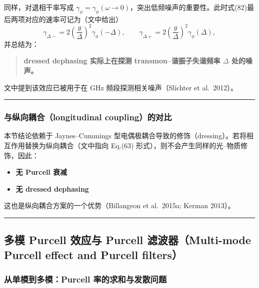 \documentclass[12pt,a4paper,oneside]{ctexbook}
\begin{document}
同样，对退相干率写成 $\gamma_\phi=\gamma_\phi(\omega\to 0)$，突出低频噪声的重要性。此时式(82)最后两项对应的速率可记为（文中给出）
\begin{equation}
\gamma_{\Delta-}=2\left(\frac{g}{\Delta}\right)^2\gamma_\phi(-\Delta),\qquad
\gamma_{\Delta+}=2\left(\frac{g}{\Delta}\right)^2\gamma_\phi(\Delta),
\end{equation}
并总结为：

\begin{quote}
\textbf{dressed dephasing 实际上在探测 transmon--谐振子失谐频率 $\Delta$ 处的噪声。}
\end{quote}

文中提到该效应已被用于在 GHz 频段探测相关噪声（Slichter et al.\ 2012）。

\bigskip\hrule\bigskip

\subsubsection{与纵向耦合（longitudinal coupling）的对比}

本节结论依赖于 Jaynes--Cummings 型电偶极耦合导致的修饰（dressing）。若将相互作用替换为纵向耦合（文中指向 Eq.(63) 形式），则不会产生同样的光--物质修饰，因此：

\begin{itemize}
  \item \textbf{无 Purcell 衰减}
  \item \textbf{无 dressed dephasing}
\end{itemize}

这也是纵向耦合方案的一个优势（Billangeon et al.\ 2015a; Kerman 2013）。

\bigskip\hrule\bigskip

\subsection{多模 Purcell 效应与 Purcell 滤波器（Multi-mode Purcell effect and Purcell filters）}

\subsubsection{从单模到多模：Purcell 率的求和与发散问题}
\end{document}
